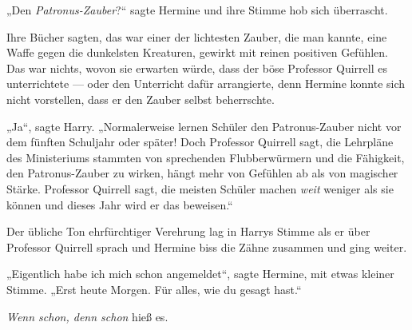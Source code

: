 „Den \emph{Patronus-Zauber}?“ sagte Hermine und ihre Stimme hob sich überrascht.

Ihre Bücher sagten, das war einer der lichtesten Zauber, die man kannte, eine Waffe gegen die dunkelsten Kreaturen, gewirkt mit reinen positiven Gefühlen. Das war nichts, wovon sie erwarten würde, dass der böse Professor Quirrell es unterrichtete — oder den Unterricht dafür arrangierte, denn Hermine konnte sich nicht vorstellen, dass er den Zauber selbst beherrschte.

„Ja“, sagte Harry.
„Normalerweise lernen Schüler den Patronus-Zauber nicht vor dem fünften Schuljahr oder später! Doch Professor Quirrell sagt, die Lehrpläne des Ministeriums stammten von sprechenden Flubberwürmern und die Fähigkeit, den Patronus-Zauber zu wirken, hängt mehr von Gefühlen ab als von magischer Stärke. Professor Quirrell sagt, die meisten Schüler machen \emph{weit} weniger als sie können und dieses Jahr wird er das beweisen.“

Der übliche Ton ehrfürchtiger Verehrung lag in Harrys Stimme als er über Professor Quirrell sprach und Hermine biss die Zähne zusammen und ging weiter.

„Eigentlich habe ich mich schon angemeldet“, sagte Hermine, mit etwas kleiner Stimme.
„Erst heute Morgen. Für alles, wie du gesagt hast.“

\emph{Wenn schon, denn schon} hieß es.

